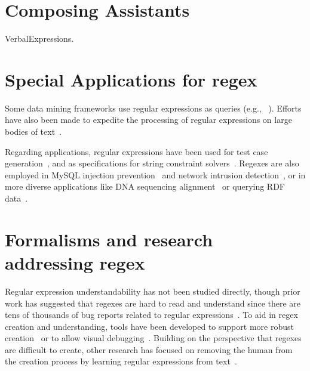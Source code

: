 \section{Composing Assistants}
VerbalExpressions.


\section{Special Applications for regex}

Some data mining frameworks use regular expressions as queries (e.g., ~\cite{Begel:2010:CDE:1806799.1806821}). Efforts have also been made to expedite the processing of regular expressions on large bodies of text~\cite{Baeza-Yates:1996:FTS:235809.235810}.


Regarding applications, regular expressions have been used for test case generation~\cite{Ghosh:2013:JAT:2486788.2486925, Galler:2014:STD:2683035.2683100, Anand:2013:OSM:2503903.2503991, Tillmann:2014:TAT:2642937.2642941},  and
as specifications for string constraint solvers~\cite{Trinh:2014:SSS:2660267.2660372, hampi}.
Regexes are also employed in MySQL injection prevention~\cite{Yeole:2011:ADT:1980022.1980229} and network intrusion detection~\cite{network}, or in more diverse applications like DNA sequencing alignment~\cite{1594922} or querying RDF data~\cite{Lee:2010:PSQ:1871871.1871877, Alkhateeb:2009:ESR:1540656.1540975}.


\section{Formalisms and research addressing regex}

Regular expression understandability has not been studied directly, though prior work has suggested that regexes are hard to read and understand since there are tens of thousands of bug reports related to regular expressions~\cite{Spishak:2012:TSR:2318202.2318207}.
To aid in regex creation and understanding,  tools have been developed to support more robust creation~\cite{Spishak:2012:TSR:2318202.2318207} or to allow visual debugging~\cite{Beck:2014:RVD:2591062.2591111}. Building on the perspective that regexes are difficult to create, other research has focused on removing the human from the creation process by learning regular expressions from  text~\cite{Babbar:2010:CBA:1871840.1871848, Li:2008:REL:1613715.1613719}.




